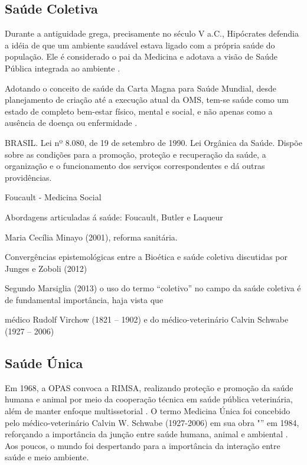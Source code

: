 \subsection{Saúde Coletiva}

\indent Durante a antiguidade grega, precisamente no século V a.C., Hipócrates defendia a idéia de que um ambiente saudável estava ligado com a própria saúde do população. Ele é considerado o pai da Medicina e adotava a visão de Saúde Pública integrada ao ambiente \cite{CFMVSaude}.

\indent Adotando o conceito de saúde da Carta Magna para Saúde Mundial, desde planejamento de criação até a execução atual da \acrfull{OMS}, tem-se saúde como um estado de completo bem-estar físico, mental e social, e não apenas como a ausência de doença ou enfermidade \cite{OMS2022S1, ParranHEALTH}.

\indent BRASIL. Lei nº 8.080, de 19 de setembro de 1990. Lei Orgânica da Saúde. Dispõe sobre as condições  para a promoção, proteção  e  recuperação  da  saúde,  a  organização  e  o  funcionamento  dos  serviços correspondentes  e  dá  outras providências.

\indent Foucault - Medicina Social

\indent Abordagens articuladas á saúde: Foucault, Butler e Laqueur

\indent Maria Cecília Minayo (2001), reforma sanitária.

\indent Convergências epistemológicas entre a Bioética e saúde coletiva discutidas por Junges
e Zoboli (2012)

\indent Segundo Marsiglia (2013) o uso do termo “coletivo” no campo da saúde coletiva é de
fundamental importância, haja vista que

\indent médico Rudolf Virchow (1821 – 1902) e do médico-veterinário Calvin Schwabe (1927 – 2006)

\subsection{Saúde Única}

\indent Em 1968, a \acrfull{OPAS} convoca a \acrfull{RIMSA}, realizando proteção e promoção da saúde humana e animal por meio da cooperação técnica em saúde pública veterinária, além de manter enfoque multissetorial \cite{S1_OPAS_OMS}. O termo Medicina Única foi concebido pelo médico-veterinário Calvin W. Schwabe (1927-2006) em sua obra "” em 1984, reforçando a importância da junção entre saúde humana, animal e ambiental \cite{CFMVSaude}. Aos poucos, o mundo foi despertando para a importância da interação entre saúde e meio ambiente.

